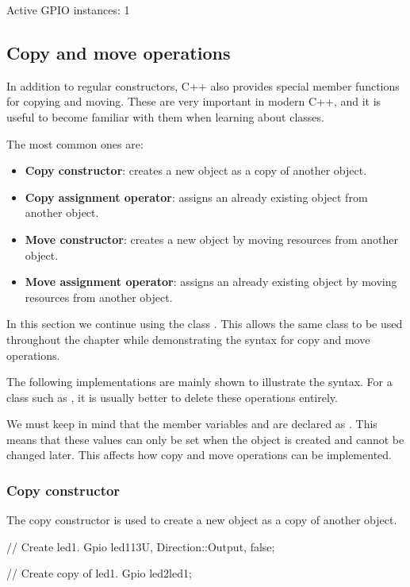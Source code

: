 \begin{console}
Active GPIO instances: 1
\end{console}

\subsection{Copy and move operations}
\label{c2:sec:copymove2}
In addition to regular constructors, C++ also provides special member functions for copying and
moving. These are very important in modern C++, and it is useful to become familiar with them when
learning about classes.

The most common ones are:
\begin{itemize}
  \item \textbf{Copy constructor}: creates a new object as a copy of another object.
  \item \textbf{Copy assignment operator}: assigns an already existing object from another object.
  \item \textbf{Move constructor}: creates a new object by moving resources from another object.
  \item \textbf{Move assignment operator}: assigns an already existing object by moving resources
    from another object.
\end{itemize}
In this section we continue using the class . This allows the same class to be used
throughout the chapter while demonstrating the syntax for copy and move operations.

The following implementations are mainly shown to illustrate the syntax. For a class such as
, it is usually better to delete these operations entirely.

We must keep in mind that the member variables  and  are declared as
. This means that these values can only be set when the object is created and cannot be
changed later. This affects how copy and move operations can be implemented.

\subsubsection{Copy constructor}
The copy constructor is used to create a new object as a copy of another object.

\begin{cppcode}
// Create led1.
Gpio led1{13U, Direction::Output, false};

// Create copy of led1.
Gpio led2{led1};
\end{cppcode}


